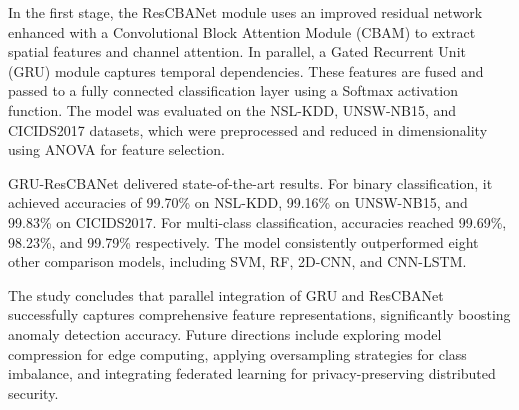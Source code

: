 \documentclass[12pt,a4paper]{report}
\begin{document}
In the first stage, the ResCBANet module uses an improved residual network enhanced with a Convolutional Block Attention Module (CBAM) to extract spatial features and channel attention. In parallel, a Gated Recurrent Unit (GRU) module captures temporal dependencies. These features are fused and passed to a fully connected classification layer using a Softmax activation function. The model was evaluated on the NSL-KDD, UNSW-NB15, and CICIDS2017 datasets, which were preprocessed and reduced in dimensionality using ANOVA for feature selection.

GRU-ResCBANet delivered state-of-the-art results. For binary classification, it achieved accuracies of 99.70\% on NSL-KDD, 99.16\% on UNSW-NB15, and 99.83\% on CICIDS2017. For multi-class classification, accuracies reached 99.69\%, 98.23\%, and 99.79\% respectively. The model consistently outperformed eight other comparison models, including SVM, RF, 2D-CNN, and CNN-LSTM.

The study concludes that parallel integration of GRU and ResCBANet successfully captures comprehensive feature representations, significantly boosting anomaly detection accuracy. Future directions include exploring model compression for edge computing, applying oversampling strategies for class imbalance, and integrating federated learning for privacy-preserving distributed security.
\end{document}
